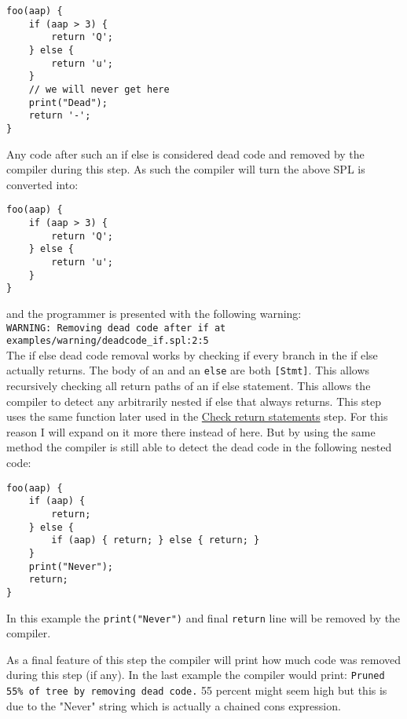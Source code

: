 \documentclass{report}
\begin{document}
\begin{lstlisting}[style=SPL]
foo(aap) {
    if (aap > 3) {
        return 'Q';  
    } else {
        return 'u';
    }
    // we will never get here
    print("Dead");
    return '-';
}
\end{lstlisting}

\noindent Any code after such an if else is considered dead code and removed by the compiler during this step. As such the compiler will turn the above SPL is converted into: 

\begin{lstlisting}[style=SPL]
foo(aap) {
    if (aap > 3) {
        return 'Q';  
    } else {
        return 'u';
    }
}
\end{lstlisting}

\noindent and the programmer is presented with the following warning:\vspace{.1cm}\\
\noindent\small\texttt{\textcolor{warning}{WARNING:} Removing dead code after if at \textcolor{filename}{examples/warning/deadcode\_if.spl:2:5}}
\\ 
The if else dead code removal works by checking if every branch in the if else actually returns. The body of an  and an \texttt{else} are both \texttt{[Stmt]}.  
This allows recursively checking all return paths of an if else statement. This allows the compiler to detect any arbitrarily nested if else that always returns.
This step uses the same function later used in the \hyperref[sec:Check-Returns]{Check return statements} step. For this reason I will expand on it more there instead of here. 
But by using the same method the compiler is still able to detect the dead code in the following nested code:

\begin{lstlisting}[style=SPL]
foo(aap) {
    if (aap) {
        return;
    } else {
        if (aap) { return; } else { return; }
    }
    print("Never");
    return;
}
\end{lstlisting}

\noindent In this example the \texttt{print("Never")} and final \texttt{return} line will be removed by the compiler. 

As a final feature of this step the compiler will print how much code was removed during this step (if any). In the last example the compiler would print:
\texttt{\textcolor{info}{Pruned \textcolor{filename}{55\%} of tree by removing dead code.}} 55 percent might seem high but this is due to the "Never" string which is actually a chained cons expression.
\end{document}
